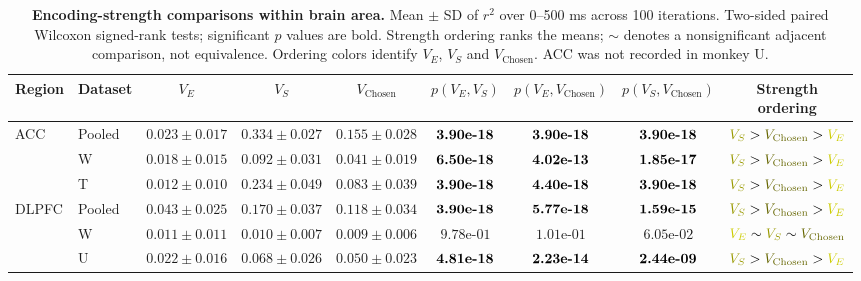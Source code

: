 \documentclass[pdflatex,sn-mathphys-num]{sn-jnl}%
\begin{document}
\clearpage
\begin{table}[p]\centering
\caption{\textbf{Encoding-strength comparisons within brain area.} Mean $\pm$ SD of $r^2$ over 0--500 ms across 100 iterations. Two-sided paired Wilcoxon signed-rank tests; significant $p$ values are bold. Strength ordering ranks the means; $\sim$ denotes a nonsignificant adjacent comparison, not equivalence. Ordering colors identify $V_E$, $V_S$ and $V_{\mathrm{Chosen}}$. ACC was not recorded in monkey U.}
\label{tab:supp_r2_by_area}
\begingroup\fontsize{7}{8.5}\selectfont\setlength{\tabcolsep}{1.5pt}
\begin{tabular*}{\textwidth}{@{\extracolsep{\fill}}llccccccc@{}}\toprule
Region & Dataset & $V_E$ & $V_S$ & $V_{\mathrm{Chosen}}$ & $p(V_E,V_S)$ & $p(V_E,V_{\mathrm{Chosen}})$ & $p(V_S,V_{\mathrm{Chosen}})$ & \shortstack{Strength\\ordering} \\
\midrule
ACC & Pooled & $0.023 \pm  0.017$ & $0.334 \pm  0.027$ & $0.155 \pm  0.028$ & $\text{\bfseries \mbox{3.90e-18}}$ & $\text{\bfseries \mbox{3.90e-18}}$ & $\text{\bfseries \mbox{3.90e-18}}$ & $\textcolor{valueS}{V_S} > \textcolor{valueChosen}{V_{\mathrm{Chosen}}} > \textcolor{valueE}{V_E}$ \\
  & W & $0.018 \pm  0.015$ & $0.092 \pm  0.031$ & $0.041 \pm  0.019$ & $\text{\bfseries \mbox{6.50e-18}}$ & $\text{\bfseries \mbox{4.02e-13}}$ & $\text{\bfseries \mbox{1.85e-17}}$ & $\textcolor{valueS}{V_S} > \textcolor{valueChosen}{V_{\mathrm{Chosen}}} > \textcolor{valueE}{V_E}$ \\
  & T & $0.012 \pm  0.010$ & $0.234 \pm  0.049$ & $0.083 \pm  0.039$ & $\text{\bfseries \mbox{3.90e-18}}$ & $\text{\bfseries \mbox{4.40e-18}}$ & $\text{\bfseries \mbox{3.90e-18}}$ & $\textcolor{valueS}{V_S} > \textcolor{valueChosen}{V_{\mathrm{Chosen}}} > \textcolor{valueE}{V_E}$ \\
\midrule
DLPFC & Pooled & $0.043 \pm  0.025$ & $0.170 \pm  0.037$ & $0.118 \pm  0.034$ & $\text{\bfseries \mbox{3.90e-18}}$ & $\text{\bfseries \mbox{5.77e-18}}$ & $\text{\bfseries \mbox{1.59e-15}}$ & $\textcolor{valueS}{V_S} > \textcolor{valueChosen}{V_{\mathrm{Chosen}}} > \textcolor{valueE}{V_E}$ \\
  & W & $0.011 \pm  0.011$ & $0.010 \pm  0.007$ & $0.009 \pm  0.006$ & $\mbox{9.78e-01}$ & $\mbox{1.01e-01}$ & $\mbox{6.05e-02}$ & $\textcolor{valueE}{V_E} \sim \textcolor{valueS}{V_S} \sim \textcolor{valueChosen}{V_{\mathrm{Chosen}}}$ \\
  & U & $0.022 \pm  0.016$ & $0.068 \pm  0.026$ & $0.050 \pm  0.023$ & $\text{\bfseries \mbox{4.81e-18}}$ & $\text{\bfseries \mbox{2.23e-14}}$ & $\text{\bfseries \mbox{2.44e-09}}$ & $\textcolor{valueS}{V_S} > \textcolor{valueChosen}{V_{\mathrm{Chosen}}} > \textcolor{valueE}{V_E}$ \\

\end{tabular*}
\end{table}
\end{document}
